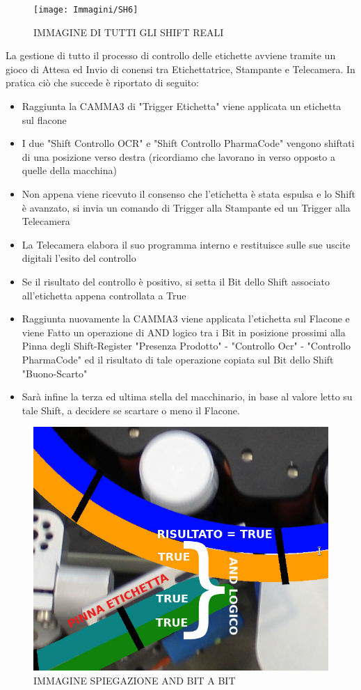 \documentclass[12pt, a4paper, oneside]{book}
\begin{document}
\begin{figure}[H]
	\centering
	\texttt{[image: Immagini/SH6]}
	\caption{IMMAGINE DI TUTTI GLI SHIFT REALI}
	\label{sh6}
\end{figure}


La gestione di tutto il processo di controllo delle etichette avviene tramite un gioco di Attesa ed Invio di conensi tra Etichettatrice, Stampante e Telecamera. In pratica ciò che succede è riportato di seguito:
\begin{itemize}
	\item Raggiunta la CAMMA3 di "Trigger Etichetta" viene applicata un etichetta sul flacone
	\item I due "Shift Controllo OCR" e "Shift Controllo PharmaCode" vengono shiftati di una posizione verso destra (ricordiamo che lavorano in verso opposto a quelle della macchina)
	\item Non appena viene ricevuto il consenso che l'etichetta è stata espulsa e lo Shift è avanzato, si invia un comando di Trigger alla Stampante ed un Trigger alla Telecamera
	\item La Telecamera elabora il suo programma interno e restituisce sulle sue uscite digitali l'esito del controllo
	\item Se il risultato del controllo è positivo, si setta il Bit dello Shift associato all'etichetta appena controllata a True
	\item Raggiunta nuovamente la CAMMA3 viene applicata l'etichetta sul Flacone e viene Fatto un operazione di AND logico tra i Bit in posizione prossimi alla Pinna degli Shift-Register "Presenza Prodotto" - "Controllo Ocr" - "Controllo PharmaCode" ed il risultato di tale operazione copiata sul Bit dello Shift "Buono-Scarto"
	\item Sarà infine la terza ed ultima stella del macchinario, in base al valore letto su tale Shift, a decidere se scartare o meno il Flacone. 
\end{itemize}

\begin{figure}[H]
	\centering
	\includegraphics[width=12cm]{Immagini/SH7}
	\caption{IMMAGINE SPIEGAZIONE AND BIT A BIT}
	\label{sh7}
\end{figure}
\end{document}
